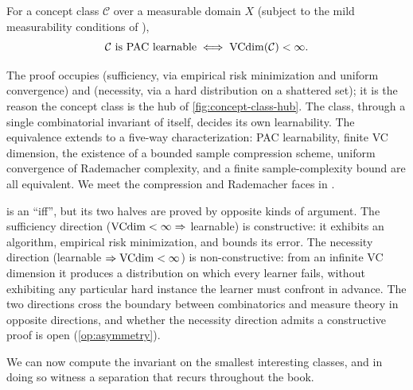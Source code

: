 \begin{thm}
\label{thm:vc-char}
For a concept class $\mathcal{C}$ over a measurable domain $X$ (subject to the mild measurability conditions of ),
\[
\mathcal{C} \text{ is PAC learnable} \iff \mathrm{VCdim}(\mathcal{C}) < \infty.
\]
\end{thm}

The proof occupies  (sufficiency, via empirical risk minimization and uniform convergence) and  (necessity, via a hard distribution on a shattered set); it is the reason the concept class is the hub of \cref{fig:concept-class-hub}. The class, through a single combinatorial invariant of itself, decides its own learnability. The equivalence extends to a five-way characterization: PAC learnability, finite VC dimension, the existence of a bounded sample compression scheme, uniform convergence of Rademacher complexity, and a finite sample-complexity bound are all equivalent. We meet the compression and Rademacher faces in .

\begin{remark}
\label{rmk:vc-asymmetry}
 is an ``iff'', but its two halves are proved by opposite kinds of argument. The sufficiency direction ($\mathrm{VCdim} < \infty \Rightarrow$ learnable) is constructive: it exhibits an algorithm, empirical risk minimization, and bounds its error. The necessity direction (learnable $\Rightarrow \mathrm{VCdim} < \infty$) is non-constructive: from an infinite VC dimension it produces a distribution on which every learner fails, without exhibiting any particular hard instance the learner must confront in advance. The two directions cross the boundary between combinatorics and measure theory in opposite directions, and whether the necessity direction admits a constructive proof is open (\cref{op:asymmetry}).
\end{remark}

We can now compute the invariant on the smallest interesting classes, and in doing so witness a separation that recurs throughout the book.

